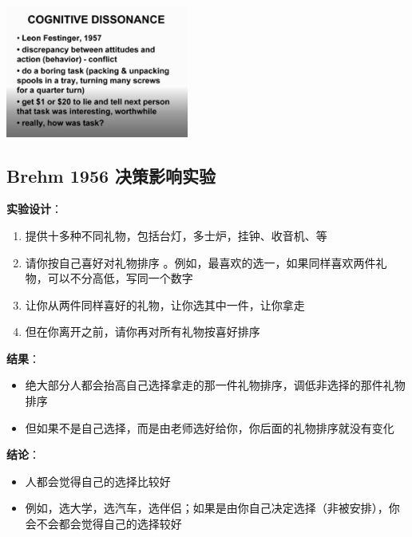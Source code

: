 \includegraphics[width=6cm]{COgnitiveDissonanceScreenshot_2022-07-08_211329.jpg}

\hypertarget{a2-brehm-1956-ux51b3ux7b56ux5f71ux54cdux5b9eux9a8c}{%
\subsection{ Brehm 1956
决策影响实验}\label{a2-brehm-1956-ux51b3ux7b56ux5f71ux54cdux5b9eux9a8c}}

\textbf{实验设计}：

\begin{enumerate}
\tightlist
\item
  提供十多种不同礼物，包括台灯，多士炉，挂钟、收音机、等
\item
  请你按自己喜好对礼物排序
  。例如，最喜欢的选一，如果同样喜欢两件礼物，可以不分高低，写同一个数字
\item
  让你从两件同样喜好的礼物，让你选其中一件，让你拿走
\item
  但在你离开之前，请你再对所有礼物按喜好排序
\end{enumerate}

\textbf{结果}：

\begin{itemize}
\tightlist
\item
  绝大部分人都会抬高自己选择拿走的那一件礼物排序，调低非选择的那件礼物排序
\item
  但如果不是自己选择，而是由老师选好给你，你后面的礼物排序就没有变化
\end{itemize}

\textbf{结论}：

\begin{itemize}
\tightlist
\item
  人都会觉得自己的选择比较好
\item
  例如，选大学，选汽车，选伴侣；如果是由你自己决定选择（非被安排），你会不会都会觉得自己的选择较好
\end{itemize}


